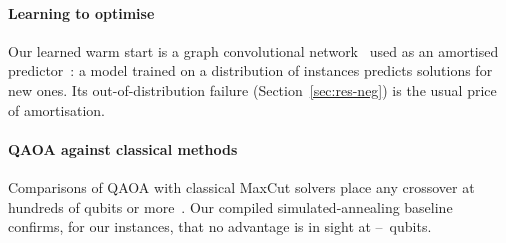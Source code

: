 \paragraph{Learning to optimise} Our learned warm start is a graph convolutional network~\cite{kipf2017gcn} used as an amortised predictor~\cite{amos2023amortized}: a model trained on a distribution of instances predicts solutions for new ones. Its out-of-distribution failure (Section~\ref{sec:res-neg}) is the usual price of amortisation.

\paragraph{QAOA against classical methods} Comparisons of QAOA with classical MaxCut solvers place any crossover at hundreds of qubits or more~\cite{guerreschi2019maxcut,lykov2023sampling}. Our compiled simulated-annealing baseline confirms, for our instances, that no advantage is in sight at \NLtwo--\NLfour\ qubits.